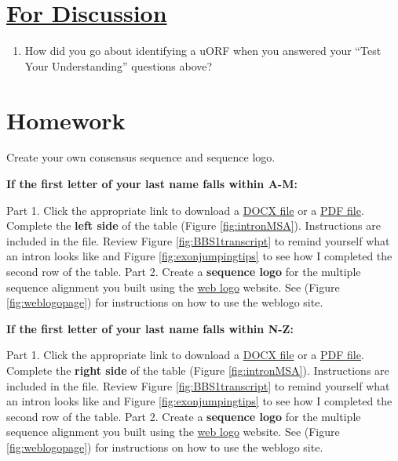 \documentclass[
]{book}
\providecommand{\tightlist}{%
  \setlength{\itemsep}{0pt}\setlength{\parskip}{0pt}}
\begin{document}
\hypertarget{for-discussion-3}{%
\section{\texorpdfstring{\href{https://docs.google.com/forms/d/e/1FAIpQLScUUIanAotTGMtaVZY51ZcYjrJF1qkbuy08SwycPIQrdn8raA/viewform?usp=sf_link}{For Discussion}}{For Discussion}}\label{for-discussion-3}}

\begin{enumerate}
\def\labelenumi{\arabic{enumi}.}
\tightlist
\item
  How did you go about identifying a uORF when you answered your ``Test Your Understanding'' questions above?
\end{enumerate}

\hypertarget{homework}{%
\section{Homework}\label{homework}}

Create your own consensus sequence and sequence logo.

\textbf{If the first letter of your last name falls within A-M:}

Part 1. Click the appropriate link to download a \href{https://drive.google.com/file/d/1d0c37m7lQloME0VEw_z_fILAdVX7DrgH/view?usp=sharing}{DOCX file} or a \href{https://drive.google.com/file/d/1NPnzu2LG8kIRGlXKBQVJdWZG3PSGzKvs/view?usp=sharing}{PDF file}. Complete the \textbf{left side} of the table (Figure \ref{fig:intronMSA}). Instructions are included in the file. Review Figure \ref{fig:BBS1transcript} to remind yourself what an intron looks like and Figure \ref{fig:exonjumpingtips} to see how I completed the second row of the table.
Part 2. Create a \textbf{sequence logo} for the multiple sequence alignment you built using the \href{https://weblogo.berkeley.edu/logo.cgi}{web logo} website. See (Figure \ref{fig:weblogopage}) for instructions on how to use the weblogo site.

\textbf{If the first letter of your last name falls within N-Z:}

Part 1. Click the appropriate link to download a \href{https://drive.google.com/file/d/1d0c37m7lQloME0VEw_z_fILAdVX7DrgH/view?usp=sharing}{DOCX file} or a \href{https://drive.google.com/file/d/1NPnzu2LG8kIRGlXKBQVJdWZG3PSGzKvs/view?usp=sharing}{PDF file}. Complete the \textbf{right side} of the table (Figure \ref{fig:intronMSA}). Instructions are included in the file. Review Figure \ref{fig:BBS1transcript} to remind yourself what an intron looks like and Figure \ref{fig:exonjumpingtips} to see how I completed the second row of the table.
Part 2. Create a \textbf{sequence logo} for the multiple sequence alignment you built using the \href{https://weblogo.berkeley.edu/logo.cgi}{web logo} website. See (Figure \ref{fig:weblogopage}) for instructions on how to use the weblogo site.
\end{document}
